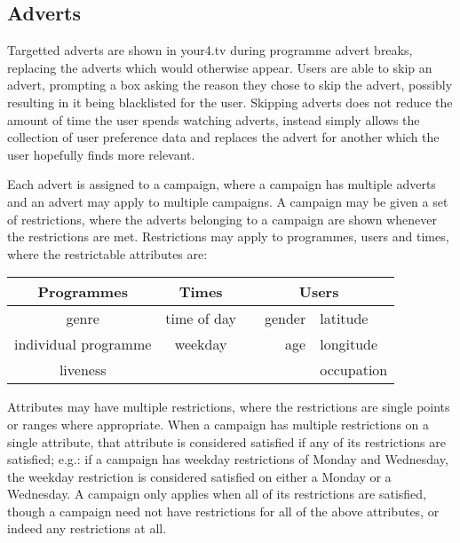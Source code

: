\subsection{Adverts}
\label{sec:design_adverts}

Targetted adverts are shown in your4.tv during programme advert breaks, replacing the adverts which would otherwise appear. Users are able to skip an advert, prompting a box asking the reason they chose to skip the advert, possibly resulting in it being blacklisted for the user. Skipping adverts does not reduce the amount of time the user spends watching adverts, instead simply allows the collection of user preference data and replaces the advert for another which the user hopefully finds more relevant.

Each advert is assigned to a campaign, where a campaign has multiple adverts and an advert may apply to multiple campaigns. A campaign may be given a set of restrictions, where the adverts belonging to a campaign are shown whenever the restrictions are met. Restrictions may apply to programmes, users and times, where the restrictable attributes are:

\begin{center}
	\begin{tabular}{c c r l}
		\textbf{Programmes} & \textbf{Times} & \multicolumn{2}{c}{\textbf{Users}} \\
		\hline
		genre & time of day & ~~gender & latitude \\ %
		individual programme & weekday & age & longitude \\
		liveness & & &  occupation \\
	\end{tabular}
\end{center}

Attributes may have multiple restrictions, where the restrictions are single points or ranges where appropriate. When a campaign has multiple restrictions on a single attribute, that attribute is considered satisfied if any of its restrictions are satisfied; e.g.: if a campaign has weekday restrictions of Monday and Wednesday, the weekday restriction is considered satisfied on either a Monday or a Wednesday. A campaign only applies when all of its restrictions are satisfied, though a campaign need not have restrictions for all of the above attributes, or indeed any restrictions at all.

